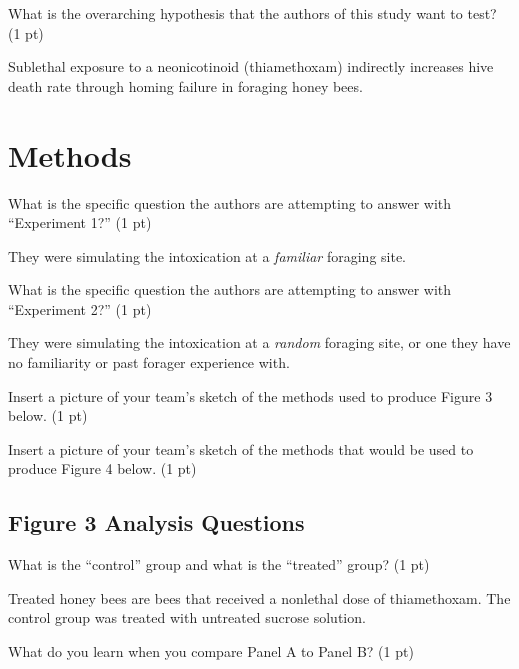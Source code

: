 \documentclass[12pt,a4paper]{article}
\begin{document}
\begin{enumerate}[font=\bfseries, wide]
    
    {\color{under}\item What is the overarching hypothesis that the authors of this study want to test? (1 pt)}
    
    Sublethal exposure to a neonicotinoid (thiamethoxam) indirectly increases hive death rate through homing failure in foraging honey bees.
    
\end{enumerate}

\section*{Methods}
\begin{enumerate}[font=\bfseries, wide, resume]
    {\color{under}\item What is the specific question the authors are attempting to answer with “Experiment 1?” (1 pt)}
    
    They were simulating the intoxication at a \textit{familiar} foraging site. 

    {\color{under}\item What is the specific question the authors are attempting to answer with “Experiment 2?” (1 pt)}

    They were simulating the intoxication at a \textit{random} foraging site, or one they have no familiarity or past forager experience with. 

    {\color{under}\item Insert a picture of your team’s sketch of the methods used to produce Figure 3 below. (1 pt)}
    
    

    {\color{under}\item Insert a picture of your team’s sketch of the methods that would be used to produce Figure 4 below. (1 pt)}
    
    \subsection*{Figure 3 Analysis Questions}
    {\color{under}\item What is the “control” group and what is the “treated” group? (1 pt)}
    
    Treated honey bees are bees that received a nonlethal dose of thiamethoxam. The control group was treated with untreated sucrose solution. 

    {\color{under}\item What do you learn when you compare Panel A to Panel B? (1 pt)}


\end{enumerate}
\end{document}

